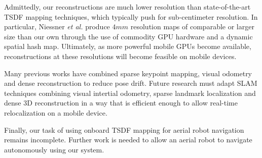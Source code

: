 \documentclass[conference]{IEEEtran}
\newcommand{\etal}{\textit{et al.}\xspace}
\newcommand{\Tango}{\textit{Tango}\xspace}
\newcommand{\TSDF}{TSDF\xspace}
\newif\iffinalcopy
\begin{document}
Admittedly, our reconstructions are much lower resolution than state-of-the-art
\TSDF mapping techniques, which typically push for sub-centimeter resolution. In
particular, Niessner \etal \cite{NiessnerHashing} produce $4mm$ resolution maps
of comparable or larger size than our own through the use of commodity GPU
hardware and a dynamic spatial hash map. Ultimately, as more powerful mobile
GPUs become available, reconstructions at these resolutions will become
feasible on mobile devices. 

Many previous works \cite{StuecklerSparseDense, niessner2014combining} have
combined sparse keypoint mapping, visual odometry and dense reconstruction to
reduce pose drift. Future research must adapt SLAM techniques combining visual
intertial odometry, sparse landmark localization and dense 3D reconstruction in
a way that is efficient enough to allow real-time relocalization on a mobile device.


Finally, our task of using onboard \TSDF mapping for aerial robot navigation
remains incomplete. Further work is needed to allow an aerial robot to navigate
autonomously using our system.


\iffinalcopy
	\section*{Acknowledgements}
	This work was done as part of Google's Advanced Technologies and Projects
	division (ATAP) for \Tango. Thanks to Johnny Lee, Joel Hesch, Esha
	Nerurkar, and Simon Lynen and other ATAP members for their close collaboration
	and support on this project. Thanks to Ryan Hickman for collecting outdoor data.
\fi



 
\end{document}
